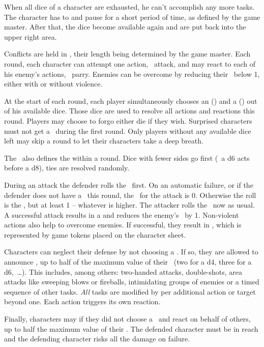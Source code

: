 {		When all dice of a character are exhausted, he can't accomplish any more tasks. The character has to  and pause for a short period of time, as defined by the game master. After that, the dice become available again and are put back into the upper right area.


		\noindent
		Conflicts are held in , their length being determined by the game master. Each round, each character can attempt one action, \eg\ attack, and may react to each of his enemy's actions, \eg\ parry. Enemies can be overcome by reducing their \HD\ below 1, either with or without violence.

		At the start of each round, each player simultaneously chooses an  (\AD) and a  (\RD) out of his available dice. Those dice are used to resolve all actions and reactions this round. Players may choose to forgo either die if they wish. Surprised characters must not get a \AD\ during the first round. Only players without any available dice left may skip a round to let their characters take a deep breath.

		The \AD\ also defines the  within a round. Dice with fewer sides go first (\eg\ a d6 acts before a d8), ties are resolved randomly.

		During an attack the defender rolls the \RD\ first. On an automatic failure, or if the defender does not have a \RD\ this round, the \TN\ for the attack is 0. Otherwise the roll is the \TN, but at least 1 -- whatever is higher. The attacker rolls the \AD\ now as usual. A successful attack results in a  and reduces the enemy's \HD\ by 1. Non-violent actions also help to overcome enemies. If successful, they result in , which is represented by game tokens placed on the character sheet.

		Characters can neglect their defense by not choosing a \RD. If so, they are allowed to announce , up to half of the maximum value of their \AD~(two for a d4, three for a d6,~\ldots). This includes, among others: two-handed attacks, double-shots, area attacks like sweeping blows or fireballs, intimidating groups of enemies or a timed sequence of other tasks. \emph{All} tasks are modified by  per additional action or target beyond one. Each action triggers its own reaction.

		Finally, characters may  if they did not choose a \AD\ and react on behalf of others, up to half the maximum value of their \RD. The defended character must be in reach and the defending character risks all the damage on failure.

}
